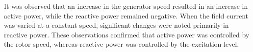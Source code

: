 \documentclass[a4paper,12pt]{article}
\begin{document}
	It was observed that an increase in the generator speed resulted in an increase in active power, while the reactive power remained negative. When the field current was varied at a constant speed, significant changes were noted primarily in reactive power. These observations confirmed that active power was controlled by the rotor speed, whereas reactive power was controlled by the excitation level.
	
	
\end{document}
